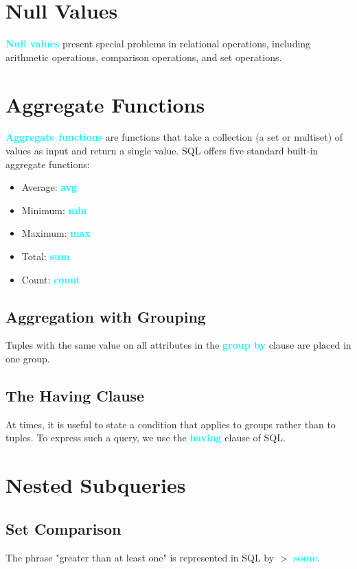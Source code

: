 \documentclass[a4paper,12pt,twoside,openany]{book}
\newcommand{\textcy}[1]{\textbf{\textcolor{cyan}{#1}}}
\begin{document}
\section{Null Values}

\textcy{Null values} present special problems in relational operations, including arithmetic operations, comparison operations, and set operations.

\section{Aggregate Functions}

\textcy{Aggregate functions} are functions that take a collection (a set or multiset) of values as input and return a single value. SQL offers five standard built-in aggregate functions:
\begin{itemize}
    \item Average: \textcy{avg}
    \item Minimum: \textcy{min}
    \item Maximum: \textcy{max}
    \item Total: \textcy{sum}
    \item Count: \textcy{count}
\end{itemize}

\subsection{Aggregation with Grouping}

Tuples with the same value on all attributes in the \textcy{group by} clause are placed in one group.

\subsection{The Having Clause}

At times, it is useful to state a condition that applies to groups rather than to tuples. To express such a query, we use the \textcy{having} clause of SQL.

\section{Nested Subqueries}
\subsection{Set Comparison}

The phrase "greater than at least one" is represented in SQL by $>$ \textcy{some}.
\end{document}
